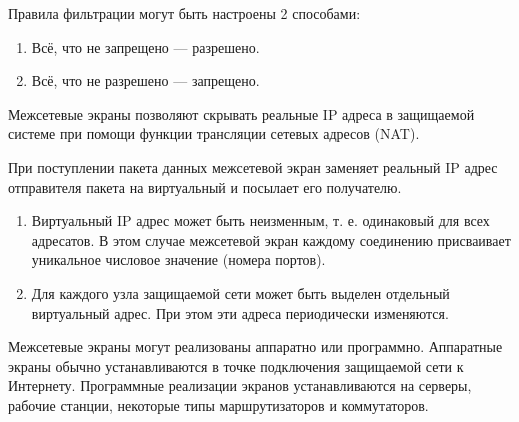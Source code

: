 \documentclass[12pt, russian, oneside, article]{ncc}
\begin{document}
Правила фильтрации могут быть настроены 2 способами:
\begin{enumerate}
\item Всё, что не запрещено --- разрешено.
\item Всё, что не разрешено --- запрещено.
\end{enumerate}

Межсетевые экраны позволяют скрывать реальные IP адреса в защищаемой системе при помощи функции трансляции сетевых адресов (NAT).

При поступлении пакета данных межсетевой экран заменяет реальный IP адрес отправителя пакета на виртуальный и посылает его получателю. 

\begin{enumerate}
\item Виртуальный IP адрес может быть неизменным, т. е. одинаковый для всех адресатов. В этом случае межсетевой экран каждому соединению присваивает уникальное числовое значение (номера портов).
\item Для каждого узла защищаемой сети может быть выделен отдельный виртуальный адрес. При этом эти адреса периодически изменяются.
\end{enumerate}

Межсетевые экраны могут реализованы аппаратно или программно. Аппаратные экраны обычно устанавливаются в точке подключения защищаемой сети к Интернету. Программные реализации экранов устанавливаются на серверы, рабочие станции, некоторые типы маршрутизаторов и коммутаторов.
\end{document}
